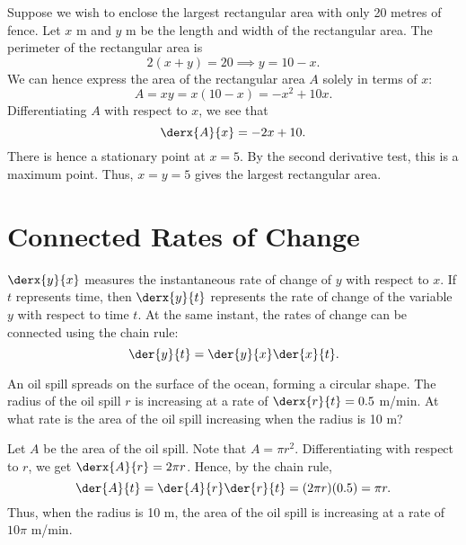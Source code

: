 \begin{example}
    Suppose we wish to enclose the largest rectangular area with only 20 metres of fence. Let $x$ m and $y$ m be the length and width of the rectangular area. The perimeter of the rectangular area is \[2(x + y) = 20 \implies y = 10 - x.\] We can hence express the area of the rectangular area $A$ solely in terms of $x$: \[A = xy = x(10 - x) = -x^2 + 10x.\] Differentiating $A$ with respect to $x$, we see that \[\derx{A}{x} = -2x + 10.\] There is hence a stationary point at $x = 5$. By the second derivative test, this is a maximum point. Thus, $x = y = 5$ gives the largest rectangular area.
\end{example}

\section{Connected Rates of Change}

$\derx{y}{x}$ measures the instantaneous rate of change of $y$ with respect to $x$. If $t$ represents time, then $\derx{y}{t}$ represents the rate of change of the variable $y$ with respect to time $t$. At the same instant, the rates of change can be connected using the chain rule: \[\der{y}{t} = \der{y}{x} \der{x}{t}.\]

\begin{sample}
    An oil spill spreads on the surface of the ocean, forming a circular shape. The radius of the oil spill $r$ is increasing at a rate of $\derx{r}{t} = 0.5$ m/min. At what rate is the area of the oil spill increasing when the radius is 10 m?
\end{sample}
\begin{sampans}
    Let $A$ be the area of the oil spill. Note that $A = \pi r^2$. Differentiating with respect to $r$, we get $\derx{A}{r} = 2\pi r$. Hence, by the chain rule, \[\der{A}{t} = \der{A}{r} \der{r}{t} = (2\pi r) (0.5) = \pi r.\] Thus, when the radius is 10 m, the area of the oil spill is increasing at a rate of $10\pi$ m/min.
\end{sampans}